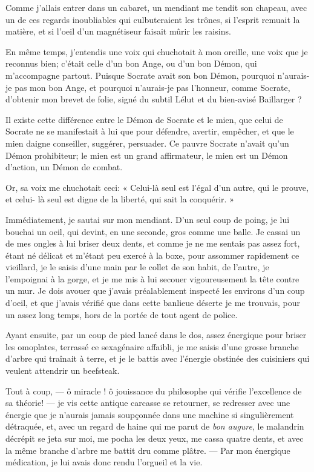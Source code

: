 Comme j’allais entrer dans un cabaret, un mendiant me
tendit son chapeau, avec un de ces regards inoubliables qui
culbuteraient les trônes, si l’esprit remuait la
matière, et si l’oeil d’un
magnétiseur faisait mûrir les raisins.

En même temps, j’entendis une voix qui chuchotait à mon
oreille, une voix que je reconnus bien; c’était celle
d’un bon Ange, ou d’un bon Démon, qui
m’accompagne partout. Puisque Socrate avait son bon
Démon, pourquoi n’aurais{}-je pas mon bon Ange, et
pourquoi n’aurais{}-je pas l’honneur,
comme Socrate, d’obtenir mon brevet de folie, signé du
subtil Lélut et du bien{}-avisé Baillarger ?

Il existe cette différence entre le Démon de Socrate et le mien, que
celui de Socrate ne se manifestait à lui que pour défendre, avertir,
empêcher, et que le mien daigne conseiller, suggérer, persuader. Ce
pauvre Socrate n’avait qu’un Démon
prohibiteur; le mien est un grand affirmateur, le mien est un Démon
d’action, un Démon de combat.

Or, sa voix me chuchotait ceci: « Celui{}-là seul est
l’égal d’un autre, qui le prouve, et
celui{}- là seul est digne de la liberté, qui sait la conquérir. »

Immédiatement, je sautai sur mon mendiant. D’un seul
coup de poing, je lui bouchai un oeil, qui devint, en une seconde, gros
comme une balle. Je cassai un de mes ongles à lui briser deux dents, et
comme je ne me sentais pas assez fort, étant né délicat et
m’étant peu exercé à la boxe, pour assommer rapidement
ce vieillard, je le saisis d’une main par le collet de
son habit, de l’autre, je l’empoignai
à la gorge, et je me mis à lui secouer vigoureusement la tête contre un
mur. Je dois avouer que j’avais préalablement inspecté
les environs d’un coup d’oeil, et que
j’avais vérifié que dans cette banlieue déserte je me
trouvais, pour un assez long temps, hors de la portée de tout agent de
police.

Ayant ensuite, par un coup de pied lancé dans le dos, assez énergique
pour briser les omoplates, terrassé ce sexagénaire affaibli, je me
saisis d’une grosse branche d’arbre
qui traînait à terre, et je le battis avec l’énergie
obstinée des cuisiniers qui veulent attendrir un beefsteak.

Tout à coup, --- ô miracle ! ô jouissance du philosophe qui vérifie
l’excellence de sa théorie! --- je vis cette antique
carcasse se retourner, se redresser avec une énergie que je
n’aurais jamais soupçonnée dans une machine si
singulièrement détraquée, et, avec un regard de haine qui me parut de
\textit{bon augure}, le malandrin décrépit se jeta sur moi, me pocha les deux
yeux, me cassa quatre dents, et avec la même branche
d’arbre me battit dru comme plâtre. --- Par mon
énergique médication, je lui avais donc rendu
l’orgueil et la vie.

